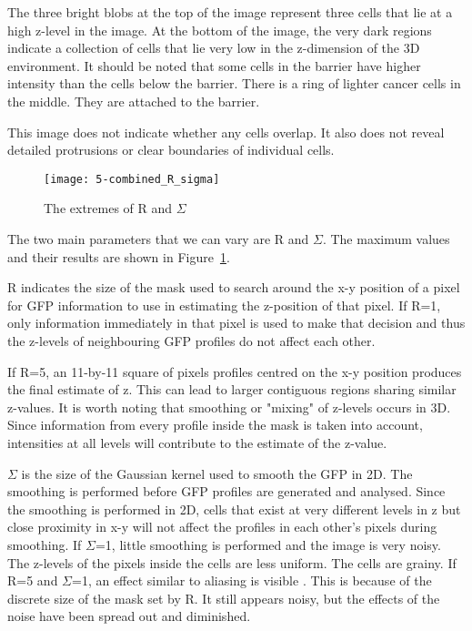The three bright blobs at the top of the image represent three cells that lie at a high z-level in the image. At the bottom of the image, the very dark regions indicate a collection of cells that lie very low in the z-dimension of the 3D environment. It should be noted that some cells in the barrier have higher intensity than the cells below the barrier. There is a ring of lighter cancer cells in the middle. They are attached to the barrier.

This image does not indicate whether any cells overlap. It also does not reveal detailed protrusions or clear boundaries of individual cells.

\begin{figure}[htbp!]
\centering
\texttt{[image: 5-combined\_R\_sigma]}
\caption{The extremes of R and $\Sigma$}
\label{fig:r_and_sigma}
\end{figure}

The two main parameters that we can vary are R and $\Sigma$. The maximum values and their results are shown in Figure~\ref{fig:r_and_sigma}.

R indicates the size of the mask used to search around the x-y position of a pixel for GFP information to use in estimating the z-position of that pixel. If R=1, only information immediately in that pixel is used to make that decision and thus the z-levels of neighbouring GFP profiles do not affect each other.

If R=5, an 11-by-11 square of pixels profiles centred on the x-y position produces the final estimate of z. This can lead to larger contiguous regions sharing similar z-values. It is worth noting that smoothing or "mixing" of z-levels occurs in 3D. Since information from every profile inside the mask is taken into account, intensities at all levels will contribute to the estimate of the z-value.

$\Sigma$ is the size of the Gaussian kernel used to smooth the GFP in 2D. The smoothing is performed before GFP profiles are generated and analysed. Since the smoothing is performed in 2D, cells that exist at very different levels in z but close proximity in x-y will not affect the profiles in each other's pixels during smoothing. If $\Sigma$=1, little smoothing is performed and the image is very noisy. The z-levels of the pixels inside the cells are less uniform. The cells are grainy. If R=5 and $\Sigma$=1, an effect similar to aliasing is visible . This is because of the discrete size of the mask set by R. It still appears noisy, but the effects of the noise have been spread out and diminished.


